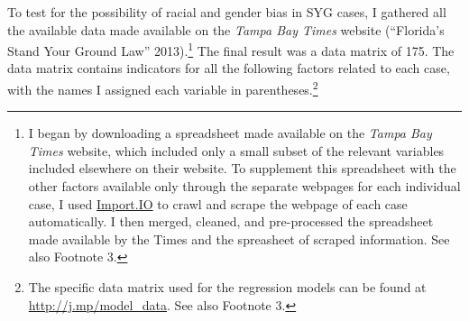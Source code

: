 \documentclass[12pt,article]{article}
\begin{document}
To test for the possibility of racial and gender bias in SYG cases, I
gathered all the available data made available on the \emph{Tampa Bay
Times} website (``Florida's Stand Your Ground Law'' 2013).\footnote{I
  began by downloading a spreadsheet made available on the \emph{Tampa
  Bay Times} website, which included only a small subset of the relevant
  variables included elsewhere on their website. To supplement this
  spreadsheet with the other factors available only through the separate
  webpages for each individual case, I used
  \href{http://import.io}{Import.IO} to crawl and scrape the webpage of
  each case automatically. I then merged, cleaned, and pre-processed the
  spreadsheet made available by the Times and the spreasheet of scraped
  information. See also Footnote 3.} The final result was a data matrix
of 175. The data matrix contains indicators for all the following
factors related to each case, with the names I assigned each variable in
parentheses.\footnote{The specific data matrix used for the regression
  models can be found at
  \href{http://j.mp/model_data}{\url{http://j.mp/model_data}}. See also
  Footnote 3.}
\end{document}

